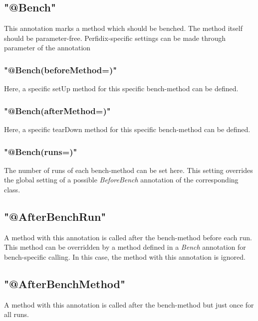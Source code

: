 \documentclass[12pt]{article}
\begin{document}
\subsection{"@Bench"}
This annotation marks a method which should be benched. The method itself should be parameter-free.
Perfidix-specific settings can be made through parameter of the annotation
\subsubsection{"@Bench(beforeMethod=)"} 
Here, a specific setUp method for this specific bench-method can be defined.
\subsubsection{"@Bench(afterMethod=)"}
Here, a specific tearDown method for this specific bench-method can be defined.
\subsubsection{"@Bench(runs=)"}
The number of runs of each bench-method can be set here. This setting  overrides the global setting of a possible \emph{BeforeBench} annotation of the corresponding class.
\subsection{"@AfterBenchRun"}
A method with this annotation is called after the bench-method before each run. This method can be overridden by a method defined in a  \emph{Bench} annotation for bench-specific calling. In this case, the method with this annotation is ignored.
\subsection{"@AfterBenchMethod"}
A method with this annotation is called after the bench-method but just once for all runs.
\end{document}
